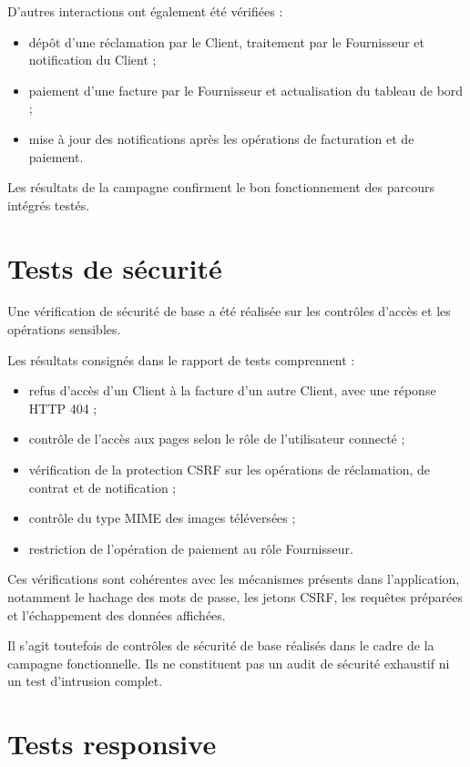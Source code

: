 D'autres interactions ont également été vérifiées :
\begin{itemize}
    \item dépôt d'une réclamation par le Client, traitement par le Fournisseur et notification du Client ;
    \item paiement d'une facture par le Fournisseur et actualisation du tableau de bord ;
    \item mise à jour des notifications après les opérations de facturation et de paiement.
\end{itemize}

Les résultats de la campagne confirment le bon fonctionnement des parcours intégrés testés.

\section{Tests de sécurité}

Une vérification de sécurité de base a été réalisée sur les contrôles d'accès et les opérations sensibles.

Les résultats consignés dans le rapport de tests comprennent :
\begin{itemize}
    \item refus d'accès d'un Client à la facture d'un autre Client, avec une réponse HTTP 404 ;
    \item contrôle de l'accès aux pages selon le rôle de l'utilisateur connecté ;
    \item vérification de la protection CSRF sur les opérations de réclamation, de contrat et de notification ;
    \item contrôle du type MIME des images téléversées ;
    \item restriction de l'opération de paiement au rôle Fournisseur.
\end{itemize}

Ces vérifications sont cohérentes avec les mécanismes présents dans l'application, notamment le hachage des mots de passe, les jetons CSRF, les requêtes préparées et l'échappement des données affichées.

Il s'agit toutefois de contrôles de sécurité de base réalisés dans le cadre de la campagne fonctionnelle. Ils ne constituent pas un audit de sécurité exhaustif ni un test d'intrusion complet.

\section{Tests responsive}

